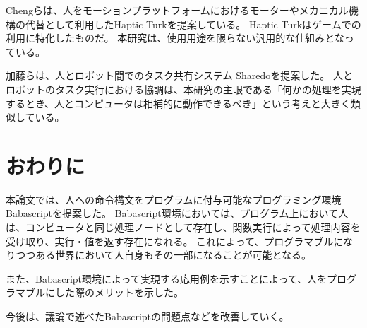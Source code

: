 Chengらは、人をモーションプラットフォームにおけるモーターやメカニカル機構の代替として利用したHaptic
Turkを提案している\cite{hapticturk}。 Haptic
Turkはゲームでの利用に特化したものだ。
本研究は、使用用途を限らない汎用的な仕組みとなっている。

加藤らは、人とロボット間でのタスク共有システム
Sharedoを提案した\cite{sharedo}。
人とロボットのタスク実行における協調は、本研究の主眼である「何かの処理を実現するとき、人とコンピュータは相補的に動作できるべき」という考えと大きく類似している。

\section{おわりに}\label{ux304aux308fux308aux306b}

本論文では、人への命令構文をプログラムに付与可能なプログラミング環境Babascriptを提案した。
Babascript環境においては、プログラム上において人は、コンピュータと同じ処理ノードとして存在し、関数実行によって処理内容を受け取り、実行・値を返す存在になれる。
これによって、プログラマブルになりつつある世界において人自身もその一部になることが可能となる。

また、Babascript環境によって実現する応用例を示すことによって、人をプログラマブルにした際のメリットを示した。

今後は、議論で述べたBabascriptの問題点などを改善していく。
